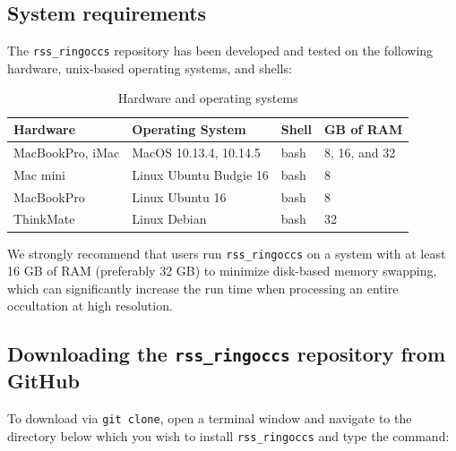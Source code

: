 \documentclass[titlepage, 12pt]{article}
\begin{document}
        \subsection{System requirements}
            The \texttt{rss\_ringoccs} repository has been developed
            and tested on the following hardware,
            unix-based operating systems, and shells:
            \begin{table}[H]
                \centering
                \begin{tabular}{|l|l|l|l|}
                    \hline
                    Hardware&Operating System&Shell &GB of RAM\\
                    \hline
                    MacBookPro, iMac & MacOS 10.13.4, 10.14.5
                    &bash
                    &8, 16, and 32\\
                    Mac mini&Linux Ubuntu Budgie 16&bash&8\\
                    MacBookPro&Linux Ubuntu 16&bash&8\\
                    ThinkMate&Linux Debian&bash&32\\
                    \hline
                \end{tabular}
                \caption{Hardware and operating systems}
                \label{tab:OS}
            \end{table}
            We strongly recommend that users run
            \texttt{rss\_ringoccs}
            on a system with at least 16 GB of RAM
            (preferably 32 GB)
            to minimize disk-based memory swapping, which can
            significantly increase the run time when processing an
            entire occultation at high resolution.
        \subsection{Downloading the \texttt{rss\_ringoccs}
                    repository from GitHub}
                    
                    To download via \texttt{git clone}, open a terminal window and navigate to the directory below which you wish to install \texttt{rss\_ringoccs} and type the command:
       
\end{document}
